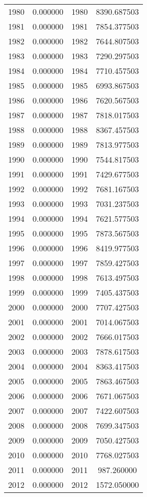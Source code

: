 \documentclass[12pt]{article}
\begin{document}
\begin{longtable}{@{}cccc@{}}
1980 & 0.000000 & 1980 & 8390.687503 \\
1981 & 0.000000 & 1981 & 7854.377503 \\
1982 & 0.000000 & 1982 & 7644.807503 \\
1983 & 0.000000 & 1983 & 7290.297503 \\
1984 & 0.000000 & 1984 & 7710.457503 \\
1985 & 0.000000 & 1985 & 6993.867503 \\
1986 & 0.000000 & 1986 & 7620.567503 \\
1987 & 0.000000 & 1987 & 7818.017503 \\
1988 & 0.000000 & 1988 & 8367.457503 \\
1989 & 0.000000 & 1989 & 7813.977503 \\
1990 & 0.000000 & 1990 & 7544.817503 \\
1991 & 0.000000 & 1991 & 7429.677503 \\
1992 & 0.000000 & 1992 & 7681.167503 \\
1993 & 0.000000 & 1993 & 7031.237503 \\
1994 & 0.000000 & 1994 & 7621.577503 \\
1995 & 0.000000 & 1995 & 7873.567503 \\
1996 & 0.000000 & 1996 & 8419.977503 \\
1997 & 0.000000 & 1997 & 7859.427503 \\
1998 & 0.000000 & 1998 & 7613.497503 \\
1999 & 0.000000 & 1999 & 7405.437503 \\
2000 & 0.000000 & 2000 & 7707.427503 \\
2001 & 0.000000 & 2001 & 7014.067503 \\
2002 & 0.000000 & 2002 & 7666.017503 \\
2003 & 0.000000 & 2003 & 7878.617503 \\
2004 & 0.000000 & 2004 & 8363.417503 \\
2005 & 0.000000 & 2005 & 7863.467503 \\
2006 & 0.000000 & 2006 & 7671.067503 \\
2007 & 0.000000 & 2007 & 7422.607503 \\
2008 & 0.000000 & 2008 & 7699.347503 \\
2009 & 0.000000 & 2009 & 7050.427503 \\
2010 & 0.000000 & 2010 & 7768.027503 \\
2011 & 0.000000 & 2011 & 987.260000 \\
2012 & 0.000000 & 2012 & 1572.050000 \\

\end{longtable}
\end{document}
